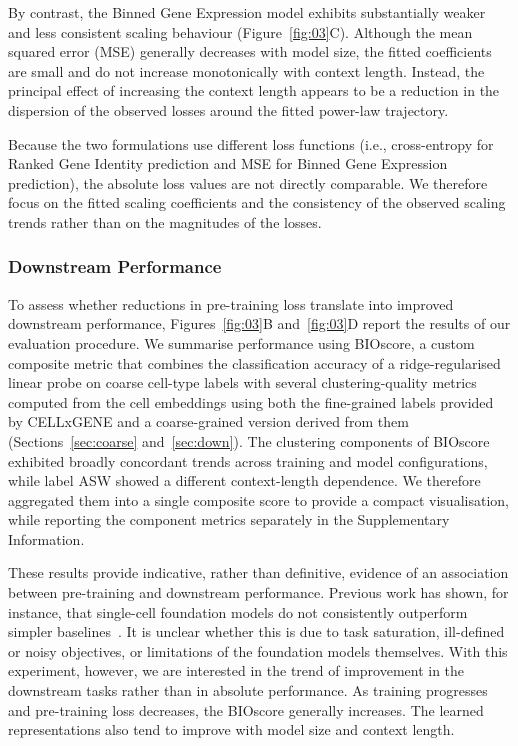 \documentclass[pdflatex,sn-nature]{sn-jnl}%
\theoremstyle{thmstyleone}%
\theoremstyle{thmstyletwo}%
\theoremstyle{thmstylethree}%
\begin{document}
By contrast, the Binned Gene Expression model exhibits substantially weaker and less consistent scaling behaviour (Figure~\ref{fig:03}C).
Although the mean squared error (MSE) generally decreases with model size, the fitted coefficients are small and do not increase monotonically with context length. 
Instead, the principal effect of increasing the context length appears to be a reduction in the dispersion of the observed losses around the fitted power-law trajectory.

Because the two formulations use different loss functions (i.e., cross-entropy for Ranked Gene Identity prediction and MSE for Binned Gene Expression prediction), the absolute loss values are not directly comparable. 
We therefore focus on the fitted scaling coefficients and the consistency of the observed scaling trends rather than on the magnitudes of the losses.

\subsubsection{Downstream Performance}

To assess whether reductions in pre-training loss translate into improved downstream performance, Figures~\ref{fig:03}B and~\ref{fig:03}D report the results of our evaluation procedure.
We summarise performance using BIOscore, a custom composite metric that combines the classification accuracy of a ridge-regularised linear probe on coarse cell-type labels with several clustering-quality metrics computed from the cell embeddings using both the fine-grained labels provided by CELLxGENE and a coarse-grained version derived from them (Sections~\ref{sec:coarse} and~\ref{sec:down}).
The clustering components of BIOscore exhibited broadly concordant trends across training and model configurations, while label ASW showed a different context-length dependence.
We therefore aggregated them into a single composite score to provide a compact visualisation, while reporting the component metrics separately in the Supplementary Information.

These results provide indicative, rather than definitive, evidence of an association between pre-training and downstream performance.
Previous work has shown, for instance, that single-cell foundation models do not consistently outperform simpler baselines~\cite{Kedzierska2025,AhlmannEltze2025,DenAdel2026}.
It is unclear whether this is due to task saturation, ill-defined or noisy objectives, or limitations of the foundation models themselves.
With this experiment, however, we are interested in the trend of improvement in the downstream tasks rather than in absolute performance.
As training progresses and pre-training loss decreases, the BIOscore generally increases. 
The learned representations also tend to improve with model size and context length.
\end{document}
